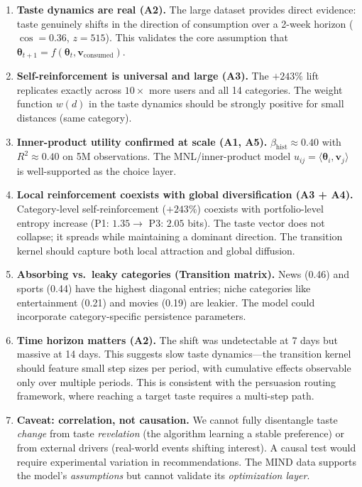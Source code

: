 \documentclass[11pt]{article}
\begin{document}
\begin{enumerate}
    \item \textbf{Taste dynamics are real (A2).} The large dataset provides direct evidence: taste genuinely shifts in the direction of consumption over a 2-week horizon ($\cos = 0.36$, $z = 515$). This validates the core assumption that $\boldsymbol{\theta}_{t+1} = f(\boldsymbol{\theta}_t, \mathbf{v}_{\text{consumed}})$.

    \item \textbf{Self-reinforcement is universal and large (A3).} The $+243\%$ lift replicates exactly across $10\times$ more users and all 14 categories. The weight function $w(d)$ in the taste dynamics should be strongly positive for small distances (same category).

    \item \textbf{Inner-product utility confirmed at scale (A1, A5).} $\beta_{\text{hist}} \approx 0.40$ with $R^2 \approx 0.40$ on 5M observations. The MNL/inner-product model $u_{ij} = \langle \boldsymbol{\theta}_i, \mathbf{v}_j \rangle$ is well-supported as the choice layer.

    \item \textbf{Local reinforcement coexists with global diversification (A3 + A4).} Category-level self-reinforcement ($+243\%$) coexists with portfolio-level entropy increase (P1: $1.35 \to$ P3: $2.05$ bits). The taste vector does not collapse; it spreads while maintaining a dominant direction. The transition kernel should capture both local attraction and global diffusion.

    \item \textbf{Absorbing vs.\ leaky categories (Transition matrix).} News (0.46) and sports (0.44) have the highest diagonal entries; niche categories like entertainment (0.21) and movies (0.19) are leakier. The model could incorporate category-specific persistence parameters.

    \item \textbf{Time horizon matters (A2).} The shift was undetectable at 7 days but massive at 14 days. This suggests slow taste dynamics---the transition kernel should feature small step sizes per period, with cumulative effects observable only over multiple periods. This is consistent with the persuasion routing framework, where reaching a target taste requires a multi-step path.

    \item \textbf{Caveat: correlation, not causation.} We cannot fully disentangle taste \emph{change} from taste \emph{revelation} (the algorithm learning a stable preference) or from external drivers (real-world events shifting interest). A causal test would require experimental variation in recommendations. The MIND data supports the model's \emph{assumptions} but cannot validate its \emph{optimization layer}.
\end{enumerate}
\end{document}
